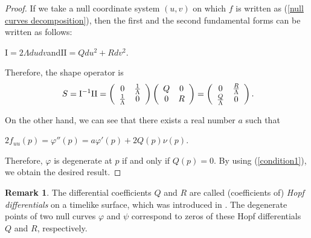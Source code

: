 \documentclass[11pt,reqno]{amsart}
\theoremstyle{plain} %
\theoremstyle{definition}
\newtheorem{remark}[theorem]{Remark}
\begin{document}
\begin{proof}
If we take a null coordinate system $(u,v)$ on which $f$ is written as (\ref{null curves decomposition}), then the first and the second fundamental forms can be written as follows:
\begin{center}
$\mathrm{I}=2\Lambda dudv$\quad and\quad $\mathrm{II}=Qdu^2+Rdv^2$.
\end{center}
Therefore, the shape operator is 
\begin{equation}\label{condition1}
\hspace{0.1cm} S=\mathrm{I}^{-1}\mathrm{II}=
\left(\begin{array}{cc} 0 & \frac{1}{\Lambda} \\ \frac{1}{\Lambda} & 0 \\ \end{array} \right)
\left(\begin{array}{cc} Q & 0 \\ 0 & R \\ \end{array} \right)=
\left(\begin{array}{cc} 0 & \frac{R}{\Lambda} \\ \frac{Q}{\Lambda} & 0 \\ \end{array} \right).
\end{equation}

On the other hand, we can see that there exists a real number $a$ such that
\begin{center}
$2f_{uu}(p)=\varphi''(p)=a\varphi'(p)+2Q(p)\nu(p)$.
\end{center}
Therefore, $\varphi$ is degenerate at $p$ if and only if $ Q(p)=0$. By using (\ref{condition1}), we obtain the desired result.
 \end{proof}
 \begin{remark}
The differential coefficients $Q$ and $R$ are called (coefficients of) {\it Hopf differentials} on a timelike surface, which was introduced in \cite{IT}. The degenerate points of two null curves $\varphi$ and $\psi$ correspond to zeros of these Hopf differentials $Q$ and $R$, respectively.
 \end{remark}
\end{document}
